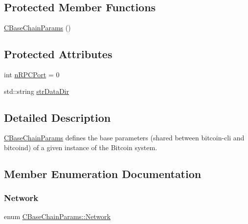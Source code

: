 \subsection*{Protected Member Functions}
\begin{DoxyCompactItemize}
\item 
\mbox{\hyperlink{class_c_base_chain_params_a4c0e84608b2fa636be3a3683653d9533}{C\+Base\+Chain\+Params}} ()
\end{DoxyCompactItemize}
\subsection*{Protected Attributes}
\begin{DoxyCompactItemize}
\item 
int \mbox{\hyperlink{class_c_base_chain_params_ae020d8f669175bcac3ab44f9c095c977}{n\+R\+P\+C\+Port}} = 0
\item 
std\+::string \mbox{\hyperlink{class_c_base_chain_params_af5868778f8c6c676aabc9fb2366d2447}{str\+Data\+Dir}}
\end{DoxyCompactItemize}


\subsection{Detailed Description}
\mbox{\hyperlink{class_c_base_chain_params}{C\+Base\+Chain\+Params}} defines the base parameters (shared between bitcoin-\/cli and bitcoind) of a given instance of the Bitcoin system. 

\subsection{Member Enumeration Documentation}
\mbox{\label{class_c_base_chain_params_a19fb46b499c21801c0ff3c8607a0994e}} 
\subsubsection{\texorpdfstring{Network}{Network}}
{\footnotesize\ttfamily enum \mbox{\hyperlink{class_c_base_chain_params_a19fb46b499c21801c0ff3c8607a0994e}{C\+Base\+Chain\+Params\+::\+Network}}}

